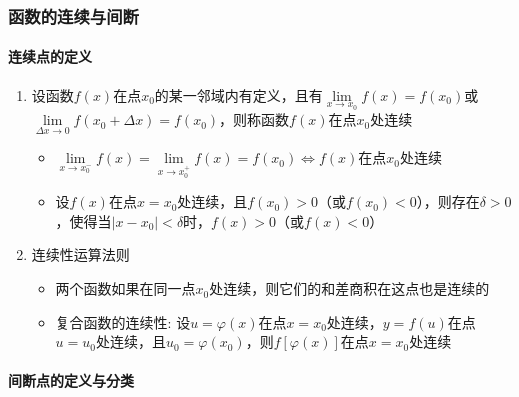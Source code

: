 \documentclass[../book.tex]{subfiles}
\begin{document}
    \subsubsection{函数的连续与间断}

    \paragraph{连续点的定义}

    \begin{enumerate}
        \item 设函数$f(x)$在点$x_0$的某一邻域内有定义，且有$\lim\limits_{x\to x_0}f(x) = f(x_0)$或$\lim\limits_{\Delta x \to 0} f(x_0 + \Delta x) = f(x_0)$，则称函数$f(x)$在点$x_0$处连续
        \begin{itemize}
            \item $\lim\limits_{x\to x_0^-}f(x) = \lim\limits_{x\to x_0^+}f(x) = f(x_0) \Leftrightarrow f(x)\text{在点}x_0\text{处连续}$
            \item 设$f(x)$在点$x=x_0$处连续，且$f(x_0) > 0$（或$f(x_0) < 0$），则存在$\delta > 0$，使得当$|x - x_0| < \delta$时，$f(x) > 0$（或$f(x) < 0$）
        \end{itemize}
        \item 连续性运算法则
        \begin{itemize}
            \item 两个函数如果在同一点$x_0$处连续，则它们的和差商积在这点也是连续的
            \item 复合函数的连续性: 设$u=\varphi(x)$在点$x = x_0$处连续，$y = f(u)$在点$u = u_0$处连续，且$u_0 = \varphi(x_0)$，则$f[\varphi(x)]$在点$x = x_0$处连续
        \end{itemize}
    \end{enumerate}

    \paragraph{间断点的定义与分类}
\end{document}

